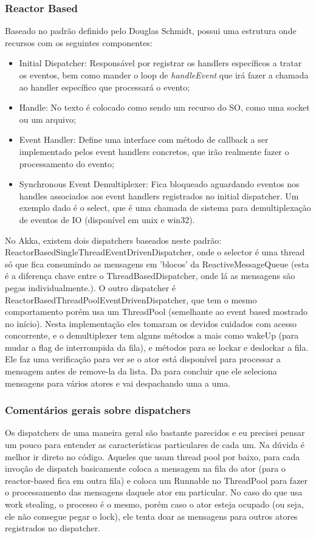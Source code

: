 \documentclass[]{article}
\begin{document}
			\subsubsection{Reactor Based}
			Baseado no padrão definido pelo Douglas Schmidt, possui uma estrutura onde recursos com os seguintes componentes:
			\begin{itemize}
				\item Initial Dispatcher: Responsável por registrar os handlers específicos a tratar os eventos, bem como
				mander o loop de \emph{handleEvent} que irá fazer a chamada ao handler específico que processará o evento;

				\item Handle: No texto é colocado como sendo um recurso do SO, como uma socket ou um arquivo;

				\item Event Handler: Define uma interface com método de callback a ser implementado pelos event handlers concretos,
				que irão realmente fazer o processamento do evento;
				
				\item Synchronous Event Demultiplexer: Fica bloqueado aguardando eventos nos handles associados aos event handlers
				registrados no initial dispatcher. Um exemplo dado é o select, que é uma chamada de sistema para demultiplexação
				de eventos de IO (disponível em unix e win32).
			\end{itemize}
			No Akka, existem dois dispatchers baseados neste padrão: ReactorBasedSingleThreadEventDrivenDispatcher, onde
			o selector é uma thread só que fica consumindo as mensagens em 'blocos' da ReactiveMessageQueue (esta é a diferença
			chave entre o ThreadBasedDispatcher, onde lá as mensagens são pegas individualmente.). O outro dispatcher
			é ReactorBasedThreadPoolEventDrivenDispatcher, que tem o mesmo comportamento porém usa um ThreadPool (semelhante
			ao event based mostrado no início). Nesta implementação eles tomaram os devidos cuidados com acesso concorrente, e
			o demultiplexer tem alguns métodos a mais como wakeUp (para mudar a flag de interrompida da fila), e métodos
			para se lockar e deslockar a fila. Ele faz uma verificação para ver se o ator está disponível para processar a 
			mensagem antes de remove-la da lista. Da para concluir que ele seleciona mensagens para vários atores e vai despachando 
			uma a uma.

		\subsubsection{Comentários gerais sobre dispatchers}
		Os dispatchers de uma maneira geral são bastante parecidos e eu precisei pensar um pouco para entender as características
		particulares de cada um. Na dúvida é melhor ir direto no código. Aqueles que usam thread pool por baixo, para cada invoção
		de dispatch basicamente coloca a mensagem na fila do ator (para o reactor-based fica em outra fila) e coloca um Runnable no
		ThreadPool para fazer o processamento das mensagens daquele ator em particular. No caso do que usa work stealing, o processo
		é o mesmo, porém caso o ator esteja ocupado (ou seja, ele não consegue pegar o lock), ele tenta doar as mensagens para 
		outros atores registrados no dispatcher.
\end{document}
